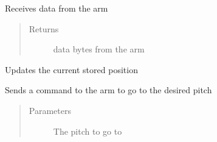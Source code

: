 \documentclass[letterpaper,10pt,english,openany,oneside]{sphinxmanual}
\begin{document}
\begin{fulllineitems}
\begin{fulllineitems}
\label{\detokenize{src/serialarmcontroller:SerialArmController.SerialArmController.recv}}
Receives data from the arm
\begin{quote}\begin{description}
\item[{Returns}] \leavevmode
data \sphinxhyphen{} bytes from the arm

\end{description}\end{quote}

\end{fulllineitems}


\begin{fulllineitems}
\label{\detokenize{src/serialarmcontroller:SerialArmController.SerialArmController.update_position}}
Updates the current stored position

\end{fulllineitems}


\begin{fulllineitems}
\label{\detokenize{src/serialarmcontroller:SerialArmController.SerialArmController.set_pitch}}
Sends a command to the arm to go to the desired pitch
\begin{quote}\begin{description}
\item[{Parameters}] \leavevmode
{} \textendash{} The pitch to go to

\end{description}\end{quote}

\end{fulllineitems}



\end{fulllineitems}
\end{document}
